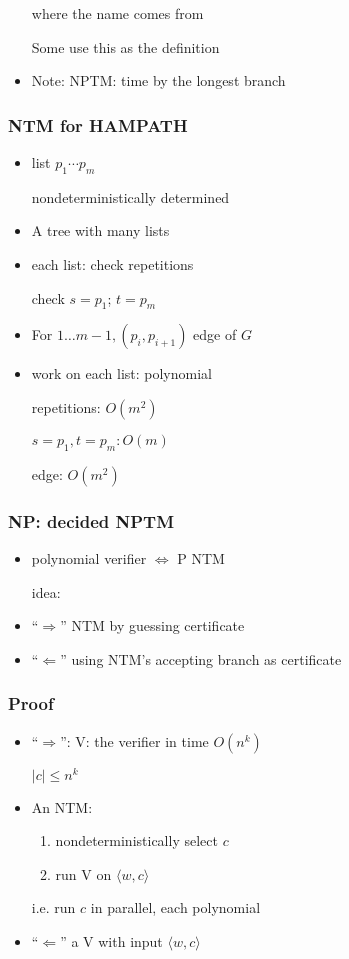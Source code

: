 \begin{frame}[allowframebreaks]
\begin{itemize}
where the name comes from

Some use this as the definition

\item Note: NPTM: time by the longest branch

\end{itemize}\end{frame} \begin{frame}[allowframebreaks] \frametitle{NTM for HAMPATH}
  \begin{itemize}
\item list $p_1\cdots p_m$

nondeterministically determined
\item A tree with many lists
\item each list: check repetitions

check $s=p_1$; $t=p_m$

\item For $1 \ldots m-1, (p_i, p_{i+1})$ edge of $G$
\item work on each list: polynomial

repetitions: $O(m^2)$

$s=p_1, t = p_m: O(m)$

edge: $O(m^2)$

\end{itemize}\end{frame} \begin{frame}[allowframebreaks] \frametitle{NP: decided NPTM}

  \begin{itemize}
\item polynomial verifier $\Leftrightarrow$ P NTM

idea:

\item ``$\Rightarrow$'' NTM by guessing certificate

\item ``$\Leftarrow$'' using NTM's accepting branch as  certificate

\end{itemize}\end{frame} \begin{frame}[allowframebreaks] \frametitle{Proof}
  \begin{itemize}
\item ``$\Rightarrow$'': V: the verifier in time $O(n^k)$

$|c|\leq n^k$
\item An  NTM:
  \begin{enumerate}
  \item nondeterministically select $c$
  \item run V on $\langle  w,c\rangle $
  \end{enumerate}
i.e. run $c$ in parallel, each polynomial
\item ``$\Leftarrow$'' a V with input $\langle  w,c\rangle $


\end{itemize}
\end{frame}
